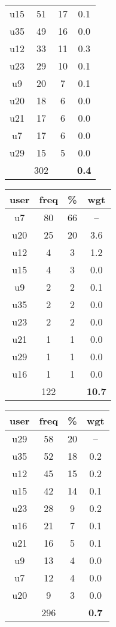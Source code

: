 \begin{appendices}
\begin{table}
\begin{tabular}{ |c|c|c|c| }
	u15 & 51 & 17 & 0.1 \\
	u35 & 49 & 16 & 0.0 \\
	u12 & 33 & 11 & 0.3 \\
	u23 & 29 & 10 & 0.1 \\
	u9 & 20 & 7 & 0.1 \\
	u20 & 18 & 6 & 0.0 \\
	u21 & 17 & 6 & 0.0 \\
	u7 & 17 & 6 & 0.0 \\
	u29 & 15 & 5 & 0.0 \\
	 & 302 & & \textbf{0.4} \\
	\hline
\end{tabular}
\begin{tabular}{ |c|c|c|c| }
	\hline
	\textbf{user} & \textbf{freq} & \textbf{\%} & \textbf{wgt} \\
	\hline
	u7 & 80 & 66 & -- \\
	u20 & 25 & 20 & 3.6 \\
	u12 & 4 & 3 & 1.2 \\
	u15 & 4 & 3 & 0.0 \\
	u9 & 2 & 2 & 0.1 \\
	u35 & 2 & 2 & 0.0 \\
	u23 & 2 & 2 & 0.0 \\
	u21 & 1 & 1 & 0.0 \\
	u29 & 1 & 1 & 0.0 \\
	u16 & 1 & 1 & 0.0 \\
	 & 122 & & \textbf{10.7} \\
	\hline
\end{tabular}
\begin{tabular}{ |c|c|c|c| }
	\hline
	\textbf{user} & \textbf{freq} & \textbf{\%} & \textbf{wgt} \\
	\hline
	u29 & 58 & 20 & -- \\
	u35 & 52 & 18 & 0.2 \\
	u12 & 45 & 15 & 0.2 \\
	u15 & 42 & 14 & 0.1 \\
	u23 & 28 & 9 & 0.2 \\
	u16 & 21 & 7 & 0.1 \\
	u21 & 16 & 5 & 0.1 \\
	u9 & 13 & 4 & 0.0 \\
	u7 & 12 & 4 & 0.0 \\
	u20 & 9 & 3 & 0.0 \\
	 & 296 & & \textbf{0.7} \\

\end{tabular}
\end{table}
\end{appendices}
